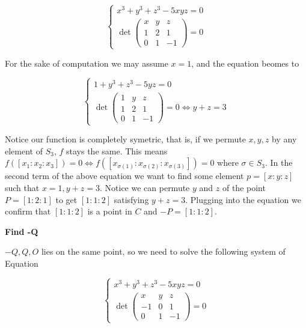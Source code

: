 \documentclass{article}
\theoremstyle{definition}
\theoremstyle{definition}
\theoremstyle{remark}
\begin{document}
\begin{equation}
	\begin{cases}
		x^3 + y^3 + z^3 - 5xyz = 0 \\
		\det \begin{pmatrix}
			x & y & z \\
			1 & 2 & 1 \\
			0 & 1 & -1
		\end{pmatrix} = 0
	\end{cases}
\end{equation}

For the sake of computation we may assume $x = 1$, and the equation beomes to 

\begin{equation}
	\begin{cases}
		1 + y^3 + z^3 - 5yz = 0 \\
		\det \begin{pmatrix}
			1 & y & z \\
			1 & 2 & 1 \\
			0 & 1 & -1
		\end{pmatrix} = 0
		\iff y + z = 3
	\end{cases}
\end{equation}

Notice our function is completely symetric, that is, if we permute $x,y,z$ by any element of $S_3$, $f$ stays the same. 
This means $f([x_1: x_2: x_3]) = 0 \iff f([x_{\sigma(1)}:x_{\sigma(2)}:x_{\sigma(3)}]) = 0$  where $\sigma \in S_3$.
In the second term of the above equation we want to find some element $p = [x: y :z]$ such that $x =1, y + z = 3$. 
Notice we can permute $y$ and $z$ of the point $P = [1: 2: 1]$ to get $[1: 1: 2]$ satisfying $y + z = 3$.
Plugging into the equation we confirm that $[1: 1: 2]$ is a point in $C$ and $-P = [1: 1: 2]$.

\textbf{Find -Q}

$-Q, Q, O$ lies on the same point, so we need to solve the following system of Equation  

\begin{equation}
	\begin{cases}
		x^3 + y^3 + z^3 - 5xyz = 0 \\
		\det \begin{pmatrix}
			x & y & z \\
			-1 & 0 & 1 \\
			0 & 1 & -1
		\end{pmatrix} = 0
	\end{cases}
\end{equation}
\end{document}

